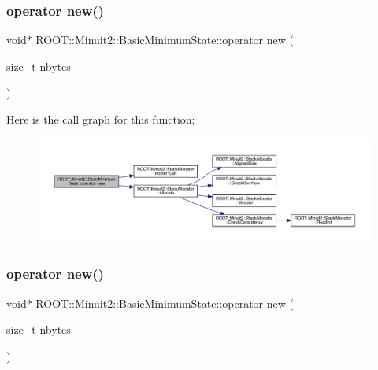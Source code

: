 \subsubsection{\texorpdfstring{operator new()}{operator new()}\hspace{0.1cm}{\footnotesize\ttfamily [2/3]}}
{\footnotesize\ttfamily void$\ast$ R\+O\+O\+T\+::\+Minuit2\+::\+Basic\+Minimum\+State\+::operator new (\begin{DoxyParamCaption}\item[{size\+\_\+t}]{nbytes }\end{DoxyParamCaption})\hspace{0.3cm}{\ttfamily [inline]}}

Here is the call graph for this function\+:
\nopagebreak
\begin{figure}[H]
\begin{center}
\leavevmode
\includegraphics[width=350pt]{d0/db1/classROOT_1_1Minuit2_1_1BasicMinimumState_ad0e5ab496757c5bee3544485a49fe7aa_cgraph}
\end{center}
\end{figure}
\mbox{\label{classROOT_1_1Minuit2_1_1BasicMinimumState_ad0e5ab496757c5bee3544485a49fe7aa}} 
\subsubsection{\texorpdfstring{operator new()}{operator new()}\hspace{0.1cm}{\footnotesize\ttfamily [3/3]}}
{\footnotesize\ttfamily void$\ast$ R\+O\+O\+T\+::\+Minuit2\+::\+Basic\+Minimum\+State\+::operator new (\begin{DoxyParamCaption}\item[{size\+\_\+t}]{nbytes }\end{DoxyParamCaption})\hspace{0.3cm}{\ttfamily [inline]}}

